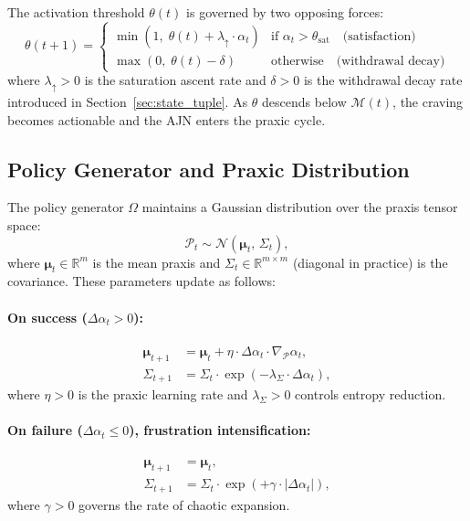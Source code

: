 \documentclass[12pt,a4paper]{article}
\begin{document}
The activation threshold $\theta(t)$ is governed by two opposing forces:
\begin{equation}
\theta(t+1) =
\begin{cases}
\min\!\left(1,\; \theta(t) + \lambda_{\uparrow} \cdot \alpha_t\right)
    & \text{if } \alpha_t > \theta_{\text{sat}} \quad \text{(satisfaction)} \\
\max\!\left(0,\; \theta(t) - \delta\right)
    & \text{otherwise} \quad \text{(withdrawal decay)}
\end{cases}
\label{eq:threshold}
\end{equation}
where $\lambda_{\uparrow} > 0$ is the saturation ascent rate and $\delta > 0$ is
the withdrawal decay rate introduced in Section~\ref{sec:state_tuple}. As $\theta$
descends below $\mathcal{M}(t)$, the craving becomes actionable and the AJN
enters the praxic cycle.

\subsection{Policy Generator and Praxic Distribution}
\label{sec:policy}

The policy generator $\Omega$ maintains a Gaussian distribution over the praxis
tensor space:
\[
\mathcal{P}_t \sim \mathcal{N}\!\left(\boldsymbol{\mu}_t,\, \Sigma_t\right),
\]
where $\boldsymbol{\mu}_t \in \mathbb{R}^m$ is the mean praxis and
$\Sigma_t \in \mathbb{R}^{m \times m}$ (diagonal in practice) is the covariance.
These parameters update as follows:

\paragraph{On success ($\Delta\alpha_t > 0$):}
\begin{align}
\boldsymbol{\mu}_{t+1} &= \boldsymbol{\mu}_t + \eta \cdot \Delta\alpha_t
    \cdot \nabla_{\mathcal{P}} \alpha_t, \label{eq:mean_update}\\
\Sigma_{t+1} &= \Sigma_t \cdot \exp\!\left(-\lambda_{\Sigma} \cdot \Delta\alpha_t\right),
    \label{eq:cov_success}
\end{align}
where $\eta > 0$ is the praxic learning rate and $\lambda_{\Sigma} > 0$ controls
entropy reduction.

\paragraph{On failure ($\Delta\alpha_t \leq 0$), frustration intensification:}
\begin{align}
\boldsymbol{\mu}_{t+1} &= \boldsymbol{\mu}_t, \\
\Sigma_{t+1} &= \Sigma_t \cdot \exp\!\left(+\gamma \cdot |\Delta\alpha_t|\right),
    \label{eq:cov_frustration}
\end{align}
where $\gamma > 0$ governs the rate of chaotic expansion.
\end{document}
